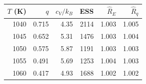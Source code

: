 \begin{center}\small
\begin{tabular}{rrrrrr}\toprule
$T$ (K) & $q$ & $c_V/k_B$ & ESS & $\widehat R_E$ & $\widehat R_q$\\\midrule
1040 & 0.715 & 4.35 & 2114 & 1.003 & 1.005\\
1045 & 0.652 & 5.31 & 1476 & 1.003 & 1.004\\
1050 & 0.575 & 5.87 & 1191 & 1.003 & 1.003\\
1055 & 0.491 & 5.69 & 1253 & 1.004 & 1.003\\
1060 & 0.417 & 4.93 & 1688 & 1.002 & 1.002\\
\bottomrule\end{tabular}\end{center}